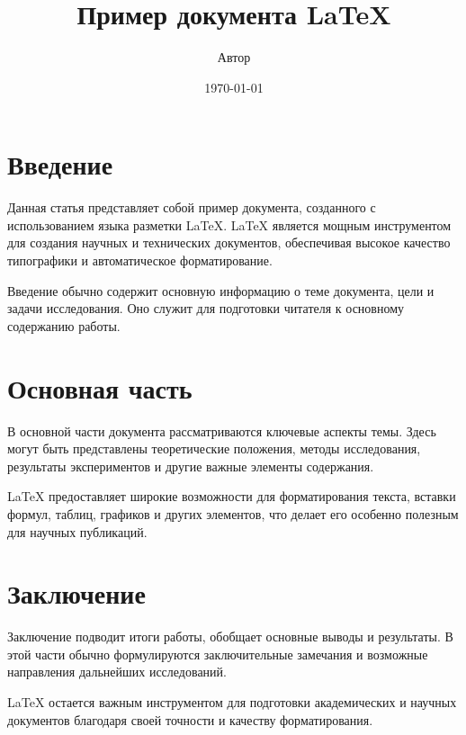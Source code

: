 \documentclass{article}
\title{Пример документа LaTeX}
\author{Автор}
\date{\today}
\begin{document}
\maketitle

\section{Введение}
Данная статья представляет собой пример документа, созданного с использованием языка разметки LaTeX. LaTeX является мощным инструментом для создания научных и технических документов, обеспечивая высокое качество типографики и автоматическое форматирование.

Введение обычно содержит основную информацию о теме документа, цели и задачи исследования. Оно служит для подготовки читателя к основному содержанию работы.

\section{Основная часть}
В основной части документа рассматриваются ключевые аспекты темы. Здесь могут быть представлены теоретические положения, методы исследования, результаты экспериментов и другие важные элементы содержания.

LaTeX предоставляет широкие возможности для форматирования текста, вставки формул, таблиц, графиков и других элементов, что делает его особенно полезным для научных публикаций.

\section{Заключение}
Заключение подводит итоги работы, обобщает основные выводы и результаты. В этой части обычно формулируются заключительные замечания и возможные направления дальнейших исследований.

LaTeX остается важным инструментом для подготовки академических и научных документов благодаря своей точности и качеству форматирования.
\end{document}

